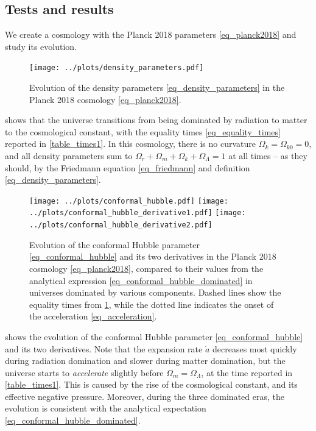 \documentclass[10pt,a4paper]{article}
\begin{document}
\subsection{Tests and results}

We create a cosmology with the Planck 2018 parameters \eqref{eq_planck2018} and study its evolution.

\begin{figure}[b!]
	\centering
	\texttt{[image: ../plots/density\_parameters.pdf]}
\caption{Evolution of the density parameters \eqref{eq_density_parameters} in the Planck 2018 cosmology \eqref{eq_planck2018}.}
\label{fig_density_parameters}
\end{figure}

 shows that the universe
transitions from being dominated by radiation to matter to the cosmological constant,
with the equality times \eqref{eq_equality_times} reported in \cref{table_times1}.
In this cosmology, there is no curvature $\Omega_{k} = \Omega_{k0} = 0$,
and all density parameters sum to $\Omega_{r} + \Omega_m + \Omega_k + \Omega_\Lambda = 1$ at all times -- as they should, by the Friedmann equation \eqref{eq_friedmann} and definition \eqref{eq_density_parameters}.

\begin{figure}
	\centering
	\texttt{[image: ../plots/conformal\_hubble.pdf]}
	\texttt{[image: ../plots/conformal\_hubble\_derivative1.pdf]}
	\texttt{[image: ../plots/conformal\_hubble\_derivative2.pdf]}
	\caption{%
		Evolution of the conformal Hubble parameter \eqref{eq_conformal_hubble} and its two derivatives in the Planck 2018 cosmology \eqref{eq_planck2018},
		compared to their values from the analytical expression \eqref{eq_conformal_hubble_dominated} in universes dominated by various components.
		Dashed lines show the equality times from \cref{fig_density_parameters},
		while the dotted line indicates the onset of the acceleration \eqref{eq_acceleration}.
	}
	\label{fig_conformal_hubble}
\end{figure}

 shows the evolution of the conformal Hubble parameter \eqref{eq_conformal_hubble} and its two derivatives.
Note that the expansion rate $\dot{a}$ decreases most quickly during radiation domination and slower during matter domination,
but the universe starts to \emph{accelerate} slightly before $\Omega_m = \Omega_\Lambda$, at the time reported in \cref{table_times1}.
This is caused by the rise of the cosmological constant, and its effective negative pressure.
Moreover, during the three dominated eras,
the evolution is consistent with the analytical expectation \eqref{eq_conformal_hubble_dominated}.
\end{document}
